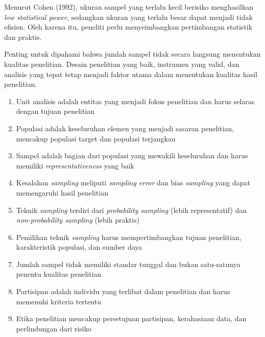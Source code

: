 \documentclass[
  indonesian,
  letterpaper,
  DIV=11,
  numbers=noendperiod]{scrreprt}
\providecommand{\tightlist}{%
  \setlength{\itemsep}{0pt}\setlength{\parskip}{0pt}}
\begin{document}
Menurut Cohen (1992), ukuran sampel yang terlalu kecil berisiko
menghasilkan \emph{low statistical power}, sedangkan ukuran yang terlalu
besar dapat menjadi tidak efisien. Oleh karena itu, peneliti perlu
menyeimbangkan pertimbangan statistik dan praktis.

Penting untuk dipahami bahwa jumlah sampel tidak secara langsung
menentukan kualitas penelitian. Desain penelitian yang baik, instrumen
yang valid, dan analisis yang tepat tetap menjadi faktor utama dalam
menentukan kualitas hasil penelitian.

\begin{tcolorbox}[enhanced jigsaw, colframe=quarto-callout-tip-color-frame, toptitle=1mm, breakable, leftrule=.75mm, arc=.35mm, toprule=.15mm, colback=white, colbacktitle=quarto-callout-tip-color!10!white, bottomtitle=1mm, bottomrule=.15mm, titlerule=0mm, title=\textcolor{quarto-callout-tip-color}{\faLightbulb}\hspace{0.5em}{Rangkuman}, coltitle=black, left=2mm, opacitybacktitle=0.6, opacityback=0, rightrule=.15mm]

\begin{enumerate}
\def\labelenumi{\arabic{enumi}.}
\tightlist
\item
  Unit analisis adalah entitas yang menjadi fokus penelitian dan harus
  selaras dengan tujuan penelitian
\item
  Populasi adalah keseluruhan elemen yang menjadi sasaran penelitian,
  mencakup populasi target dan populasi terjangkau
\item
  Sampel adalah bagian dari populasi yang mewakili keseluruhan dan harus
  memiliki \emph{representativeness} yang baik
\item
  Kesalahan \emph{sampling} meliputi \emph{sampling error} dan bias
  \emph{sampling} yang dapat memengaruhi hasil penelitian
\item
  Teknik \emph{sampling} terdiri dari \emph{probability sampling} (lebih
  representatif) dan \emph{non-probability sampling} (lebih praktis)
\item
  Pemilihan teknik \emph{sampling} harus mempertimbangkan tujuan
  penelitian, karakteristik populasi, dan sumber daya
\item
  Jumlah sampel tidak memiliki standar tunggal dan bukan satu-satunya
  penentu kualitas penelitian
\item
  Partisipan adalah individu yang terlibat dalam penelitian dan harus
  memenuhi kriteria tertentu
\item
  Etika penelitian mencakup persetujuan partisipan, kerahasiaan data,
  dan perlindungan dari risiko
\end{enumerate}

\end{tcolorbox}
\end{document}
